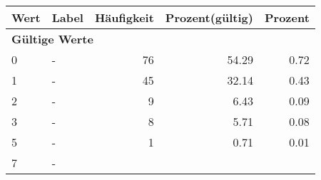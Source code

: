      \begin{longtable}{lXrrr}
     \toprule
     \textbf{Wert} & \textbf{Label} & \textbf{Häufigkeit} & \textbf{Prozent(gültig)} & \textbf{Prozent} \\
     \endhead
     \midrule
     \multicolumn{5}{l}{\textbf{Gültige Werte}}\\

     0 &
     \multicolumn{1}{X}{ -  } &


       \num{76} &
       \num[round-mode=places,round-precision=2]{54.29} &
         \num[round-mode=places,round-precision=2]{0.72} \\

     1 &
     \multicolumn{1}{X}{ -  } &


       \num{45} &
       \num[round-mode=places,round-precision=2]{32.14} &
         \num[round-mode=places,round-precision=2]{0.43} \\

     2 &
     \multicolumn{1}{X}{ -  } &


       \num{9} &
       \num[round-mode=places,round-precision=2]{6.43} &
         \num[round-mode=places,round-precision=2]{0.09} \\

     3 &
     \multicolumn{1}{X}{ -  } &


       \num{8} &
       \num[round-mode=places,round-precision=2]{5.71} &
         \num[round-mode=places,round-precision=2]{0.08} \\

     5 &
     \multicolumn{1}{X}{ -  } &


       \num{1} &
       \num[round-mode=places,round-precision=2]{0.71} &
         \num[round-mode=places,round-precision=2]{0.01} \\

     7 &
     \multicolumn{1}{X}{ -  } &



\end{longtable}
